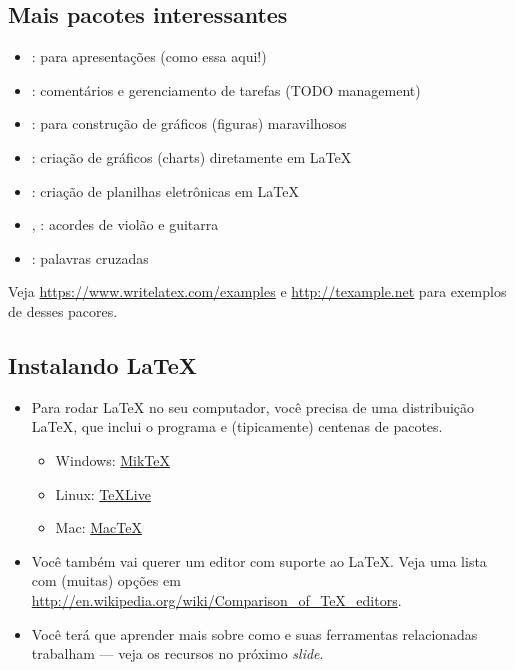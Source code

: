 \documentclass[xcolor=table]{beamer}
\begin{document}
\subsection{Mais pacotes interessantes}

\begin{frame}{\insertsubsection}
	\begin{itemize}
		\item {}: para apresentações (como essa aqui!)
		\item {}: comentários e gerenciamento de tarefas (TODO management)
		\item {}: para construção de gráficos (figuras) maravilhosos
		\item {}: criação de gráficos (charts) diretamente em \LaTeX
		\item {}: criação de planilhas eletrônicas em \LaTeX
		\item {}, : acordes de violão e guitarra
		\item {}: palavras cruzadas
	\end{itemize}
	Veja \url{https://www.writelatex.com/examples} e \url{http://texample.net} para
	exemplos de desses pacores.
\end{frame}

\subsection{Instalando \LaTeX{}}
\begin{frame}{\insertsubsection}
	\begin{itemize}
		\item Para rodar \LaTeX{} no seu computador, você precisa de uma distribuição \LaTeX{}, que inclui o programa  e (tipicamente) centenas de pacotes.
			\begin{itemize}
				\item Windows: \href{http://miktex.org/}{Mik\TeX}
				\item Linux: \href{http://tug.org/texlive/}{\TeX Live}
				\item Mac: \href{http://tug.org/mactex/}{Mac\TeX}
			\end{itemize} 
		\item Você também vai querer um editor com suporte ao \LaTeX{}. Veja uma lista com (muitas) opções em {\scriptsize \url{http://en.wikipedia.org/wiki/Comparison_of_TeX_editors}}.
		\item Você terá que aprender mais sobre como  e suas ferramentas relacionadas trabalham --- veja os recursos no próximo \textit{slide}.
	\end{itemize}
\end{frame}
\end{document}
